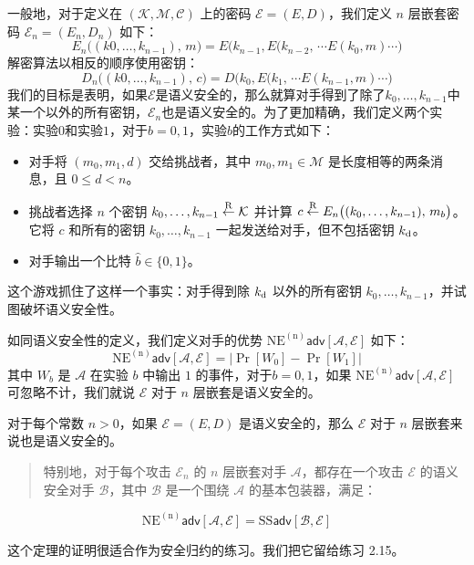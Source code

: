 一般地，对于定义在 $(\mathcal{K},\mathcal{M},\mathcal{C})$ 上的密码 $\mathcal{E}=(E,D)$，我们定义 $n$ 层嵌套密码 $\mathcal{E}_n=(E_n,D_n)$ 如下：
\[
E_n\big((k0,\dots,k_{n-1}),\,m\big)=E\big(k_{n-1},E(k_{n-2},\,\cdots E(k_0,m)\cdots\big)
\]
解密算法以相反的顺序使用密钥：
\[
D_n\big((k0,\dots,k_{n-1}),\,c\big)=D\big(k_0,E(k_1,\,\cdots E(k_{n-1},m)\cdots\big)
\]
我们的目标是表明，如果$\mathcal{E}$是语义安全的，那么就算对手得到了除了$k_0,\dots,k_{n-1}$中某一个以外的所有密钥，$\mathcal{E}_n$也是语义安全的。为了更加精确，我们定义两个实验：实验$0$和实验$1$，对于$b=0,1$，实验$b$的工作方式如下：
\begin{itemize}
	\item 对手将 $(m_0,m_1,d)$ 交给挑战者，其中 $m_0,m_1\in\mathcal{M}$ 是长度相等的两条消息，且 $0\leq d<n$。
	\item 挑战者选择 $n$ 个密钥 $k_0,\dots,k_{n-1}\overset{\rm R}\leftarrow\mathcal{K}$ 并计算 $c\overset{\rm R}\leftarrow E_n\big((k_0,\dots,k_{n-1}),\,m_b\big)$。它将 $c$ 和所有的密钥 $k_0,\dots,k_{n-1}$ 一起发送给对手，但不包括密钥 $k_{\rm d}$。
	\item 对手输出一个比特 $\hat b\in\{0,1\}$。
\end{itemize}
这个游戏抓住了这样一个事实：对手得到除 $k_{\rm d}$ 以外的所有密钥 $k_0,\dots,k_{n-1}$，并试图破坏语义安全性。

如同语义安全性的定义，我们定义对手的优势 $\mathrm{NE^{(n)}}\mathsf{adv}[\mathcal{A},\mathcal{E}]$ 如下：
\[
\mathrm{NE^{(n)}}\mathsf{adv}[\mathcal{A},\mathcal{E}]=\big\vert\Pr[W_0]-\Pr[W_1]\big\vert
\]
其中 $W_b$ 是 $\mathcal{A}$ 在实验 $b$ 中输出 $1$ 的事件，对于$b=0,1$，如果 $\mathrm{NE^{(n)}}\mathsf{adv}[\mathcal{A},\mathcal{E}]$ 可忽略不计，我们就说 $\mathcal{E}$ 对于 $n$ 层嵌套是语义安全的。

\begin{theorem}
对于每个常数 $n>0$，如果 $\mathcal{E}=(E,D)$ 是语义安全的，那么 $\mathcal{E}$ 对于 $n$ 层嵌套来说也是语义安全的。
\begin{quote}
特别地，对于每个攻击 $\mathcal{E}_n$ 的 $n$ 层嵌套对手 $\mathcal{A}$，都存在一个攻击 $\mathcal{E}$ 的语义安全对手 $\mathcal{B}$，其中 $\mathcal{B}$ 是一个围绕 $\mathcal{A}$ 的基本包装器，满足：
\end{quote}
\[
\mathrm{NE^{(n)}}\mathsf{adv}[\mathcal{A},\mathcal{E}]=\mathrm{SS}\mathsf{adv}[\mathcal{B},\mathcal{E}]
\]
\end{theorem}

\noindent
这个定理的证明很适合作为安全归约的练习。我们把它留给练习 2.15。